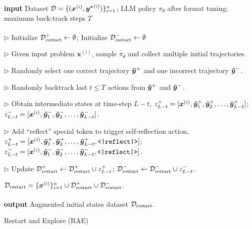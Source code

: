 \scalebox{0.9}
{
\begin{minipage}{1.1\linewidth}
\begin{algorithm}[H]
\SetAlgoLined

    \textbf{input}{ Dataset $\mathcal{D}=\{(\boldsymbol{x}^{(i)},{\boldsymbol{y^*}}^{(i)})\}_{i=1}^n$; LLM policy $\pi_\theta$ after format tuning; maximum back-track steps $T$}
\\\\
$\triangleright$ Initialize $\mathcal{D}^+_{\text{restart}} \leftarrow \emptyset$; Initialize $\mathcal{D}^-_{\text{restart}} \leftarrow \emptyset$

{   
   $\triangleright$ Given input problem $\boldsymbol{x}^{(i)}$, sample $\pi_\theta$ and collect multiple initial trajectories. 

   $\triangleright$ Randomly select one correct trajectory $\boldsymbol{\Tilde{y}}^{+}$ and one incorrect trajectory $\boldsymbol{\Tilde{y}}^{-}$.

   $\triangleright$ Randomly backtrack last $t\leq T$ actions from $\boldsymbol{\Tilde{y}}^{+}$ and $\boldsymbol{\Tilde{y}}^{-}$.

   $\triangleright$ Obtain intermediate states at time-step $L-t$,  $z^{+}_{L-t}= [\boldsymbol{x}^{(i)}, \boldsymbol{\Tilde{y}}^{+}_{1}, \boldsymbol{\Tilde{y}}^{+}_{2}, \ldots, \boldsymbol{\Tilde{y}}^{+}_{L-t}]$; $z^{-}_{L-t}=[\boldsymbol{x}^{(i)}, \boldsymbol{\Tilde{y}}^{-}_{1}, \boldsymbol{\Tilde{y}}^{-}_{2}, \ldots, \boldsymbol{\Tilde{y}}^{-}_{L-t}]$.

    $\triangleright$ Add ``reflect'' special token to trigger self-reflection action, $z^{+}_{L-t}= [\boldsymbol{x}^{(i)}, \boldsymbol{\Tilde{y}}^{+}_{1}, \boldsymbol{\Tilde{y}}^{+}_{2}, \ldots, \boldsymbol{\Tilde{y}}^{+}_{L-t}, \texttt{<|reflect|>}]$; $z^{-}_{L-t}=[\boldsymbol{x}^{(i)}, \boldsymbol{\Tilde{y}}^{-}_{1}, \boldsymbol{\Tilde{y}}^{-}_{2}, \ldots, \boldsymbol{\Tilde{y}}^{-}_{L-t}, \texttt{<|reflect|>}]$.

    $\triangleright$ Update $\mathcal{D}^+_{\text{restart}} \leftarrow \mathcal{D}^+_{\text{restart}} \cup z^{+}_{L-t}$; $\mathcal{D}^-_{\text{restart}} \leftarrow \mathcal{D}^-_{\text{restart}} \cup z^{-}_{L-t}$.
}
$\mathcal{D}_{\text{restart}} = \{\boldsymbol{x}^{(i)}\}_{i=1}^n \cup \mathcal{D}^+_{\text{restart}} \cup \mathcal{D}^-_{\text{restart}}.$
\\\\
    \textbf{output}{ Augmented initial states dataset $\mathcal{D}_{\text{restart}}$.}

 \caption{Restart and Explore (RAE)}
 \label{alg:buffer}
\end{algorithm}
\end{minipage}
}

